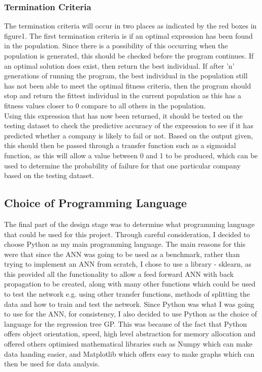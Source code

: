 \documentclass[11pt]{article}
\begin{document}
\subsubsection{Termination Criteria}
The termination criteria will occur in two places as indicated by the red boxes in figure1. The first termination criteria is if an optimal expression has been found in the population. Since there is a possibility of this occurring when the population is generated, this should be checked before the program continues. If an optimal solution does exist, then return the best individual. If after 'n' generations of running the program, the best individual in the population still has not been able to meet the optimal fitness criteria, then the program should stop  and return the fittest individual in the current population as this has a fitness values closer to 0 compare to all others in the population.  \\
Using this expression that has now been returned, it should be tested on the testing dataset to check the predictive accuracy of the expression to see if it has predicted whether a company is likely to fail or not. Based on the output given, this should then be passed through a transfer function such as a sigmoidal function, as this will allow a value between 0 and 1 to be produced, which can be used to determine the probability of failure for that one particular company based on the testing dataset. 

\subsection{Choice of Programming Language}
The final part of the design stage was to determine what programming language that could be used for this project. Through careful consideration, I decided to choose Python as my main programming language. The main reasons for this were that since the ANN was going to be used as a benchmark, rather than trying to implement an ANN from scratch, I chose to use a library - sklearn, as this provided all the functionality to allow a feed forward ANN with back propagation to be created, along with many other functions which could be used to test the network e.g. using other transfer functions, methods of splitting the data and how to train and test the network. Since Python was what I was going to use for the ANN, for consistency, I also decided to use Python as the choice of language for the regression tree GP. This was because of the fact that Python offers object orientation, speed, high level abstraction for memory allocation and offered others optimised mathematical libraries such as Numpy which can make data handing easier, and Matplotlib which offers easy to make graphs which can then be used for data analysis.
\newpage
\end{document}
